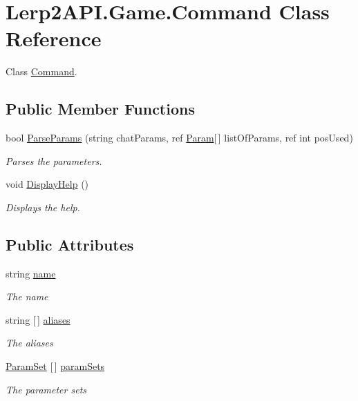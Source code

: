 \hypertarget{class_lerp2_a_p_i_1_1_game_1_1_command}{}\section{Lerp2\+A\+P\+I.\+Game.\+Command Class Reference}
\label{class_lerp2_a_p_i_1_1_game_1_1_command}


Class \hyperlink{class_lerp2_a_p_i_1_1_game_1_1_command}{Command}.  


\subsection*{Public Member Functions}
\begin{DoxyCompactItemize}
\item 
bool \hyperlink{class_lerp2_a_p_i_1_1_game_1_1_command_ab91b110ae9c032477d20eee8925d0d66}{Parse\+Params} (string chat\+Params, ref \hyperlink{class_lerp2_a_p_i_1_1_game_1_1_param}{Param}\mbox{[}$\,$\mbox{]} list\+Of\+Params, ref int pos\+Used)
\begin{DoxyCompactList}\small\item\em Parses the parameters. \end{DoxyCompactList}\item 
void \hyperlink{class_lerp2_a_p_i_1_1_game_1_1_command_a72ec5363a41d6d92d2a65f0c285f0165}{Display\+Help} ()
\begin{DoxyCompactList}\small\item\em Displays the help. \end{DoxyCompactList}\end{DoxyCompactItemize}
\subsection*{Public Attributes}
\begin{DoxyCompactItemize}
\item 
string \hyperlink{class_lerp2_a_p_i_1_1_game_1_1_command_ad5e16e070632ee3c932fd15d7b0801a6}{name}
\begin{DoxyCompactList}\small\item\em The name \end{DoxyCompactList}\item 
string \mbox{[}$\,$\mbox{]} \hyperlink{class_lerp2_a_p_i_1_1_game_1_1_command_a966e72b0127fcfb4f1fd6d06ff3e4c98}{aliases}
\begin{DoxyCompactList}\small\item\em The aliases \end{DoxyCompactList}\item 
\hyperlink{class_lerp2_a_p_i_1_1_game_1_1_param_set}{Param\+Set} \mbox{[}$\,$\mbox{]} \hyperlink{class_lerp2_a_p_i_1_1_game_1_1_command_a723913c3b312b67045b7ca68880aa054}{param\+Sets}
\begin{DoxyCompactList}\small\item\em The parameter sets \end{DoxyCompactList}\end{DoxyCompactItemize}


